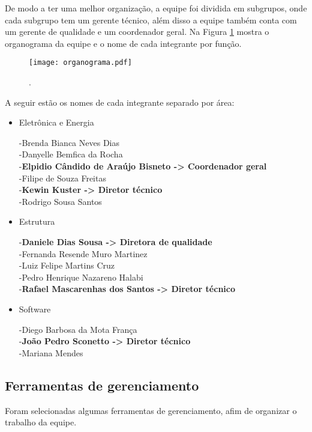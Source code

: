  De modo a ter uma melhor organização, a equipe foi dividida em subgrupos, onde cada subgrupo tem um gerente técnico, além disso a equipe também conta com um gerente de qualidade e um coordenador geral. Na Figura \ref{fig:organograma} mostra o organograma da equipe e o nome de cada integrante por função.
 
\begin{figure}[h]
\centering
\texttt{[image: organograma.pdf]}
\caption{.}\label{fig:organograma}
\end{figure} 

A seguir estão os nomes de cada integrante separado por área:

\begin{itemize}
\item Eletrônica e Energia

-Brenda Bianca Neves Dias\\
-Danyelle Bemfica da Rocha\\
-\textbf{Elpidio Cândido de Araújo Bisneto -> Coordenador geral}\\
-Filipe de Souza Freitas\\
-\textbf{Kewin Kuster -> Diretor técnico}\\
-Rodrigo Sousa Santos

\item Estrutura

-\textbf{Daniele Dias Sousa -> Diretora de qualidade}\\
-Fernanda Resende Muro Martinez\\
-Luiz Felipe Martins Cruz\\
-Pedro Henrique Nazareno Halabi\\
-\textbf{Rafael Mascarenhas dos Santos -> Diretor técnico}

\item Software

-Diego Barbosa da Mota França\\
-\textbf{João Pedro Sconetto -> Diretor técnico}\\
-Mariana Mendes 


\end{itemize}

\subsection{Ferramentas de gerenciamento}

Foram selecionadas algumas ferramentas de gerenciamento, afim de organizar o trabalho da equipe.

